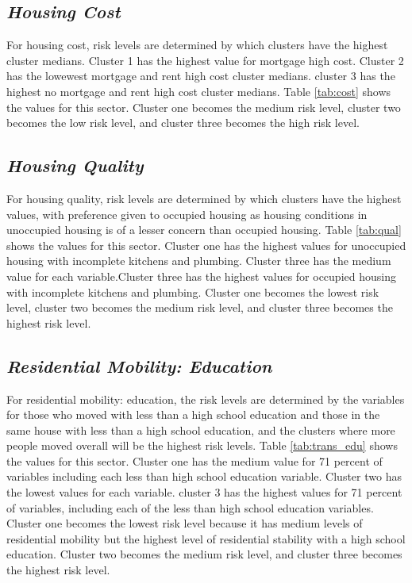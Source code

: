 

\subsection{\textit{Housing Cost}}

For housing cost, risk levels are determined by which clusters have the highest cluster medians. Cluster 1 has the highest value for mortgage high cost. Cluster 2 has the lowewest mortgage and rent high cost cluster medians. cluster 3 has the highest no mortgage and rent high cost cluster medians. Table \ref{tab:cost} shows the values for this sector. Cluster one becomes the medium risk level, cluster two becomes the low risk level, and cluster three becomes the high risk level. 



\subsection{\textit{Housing Quality}}

For housing quality, risk levels are determined by which clusters have the highest values, with preference given to occupied housing as housing conditions in unoccupied housing is of a lesser concern than occupied housing. Table \ref{tab:qual} shows the values for this sector. Cluster one has the highest values for unoccupied housing with incomplete kitchens and plumbing. Cluster three has the medium value for each variable.Cluster three has the highest values for occupied housing with incomplete kitchens and plumbing. Cluster one becomes the lowest risk level, cluster two becomes the medium risk level, and cluster three becomes the highest risk level. 





\subsection{\textit{Residential Mobility: Education}}
For residential mobility: education, the risk levels are determined by the variables for those who moved with less than a high school education and those in the same house with less than a high school education, and the clusters where more people moved overall will be the highest risk levels. Table \ref{tab:trans_edu} shows the values for this sector. Cluster one has the medium value for 71 percent of variables including each less than high school education variable. Cluster two has the lowest values for each variable. cluster 3 has the highest values for 71 percent of variables, including each of the less than high school education variables. Cluster one becomes the lowest risk level because it has medium levels of residential mobility but the highest level of residential stability with a high school education. Cluster two becomes the medium risk level, and cluster three becomes the highest risk level. 

